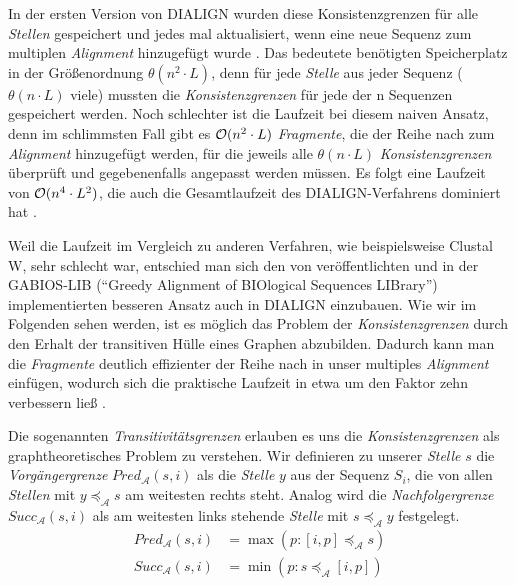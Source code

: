 In der ersten Version von DIALIGN wurden diese Konsistenzgrenzen für alle \emph{Stellen} gespeichert und jedes mal aktualisiert, wenn eine neue Sequenz zum multiplen \emph{Alignment} hinzugefügt wurde \citep{mdw96}. Das bedeutete benötigten Speicherplatz in der Größenordnung $\theta(n^2\cdot L)$, denn für jede \emph{Stelle} aus jeder Sequenz ($\theta(n\cdot L)$ viele) mussten die \emph{Konsistenzgrenzen} für jede der n Sequenzen gespeichert werden. Noch schlechter ist die Laufzeit bei diesem naiven Ansatz, denn im schlimmsten Fall gibt es $\mathcal{O}(n^2\cdot L)$ \emph{Fragmente}, die der Reihe nach zum \emph{Alignment} hinzugefügt werden, für die jeweils alle $\theta(n\cdot L)$ \emph{Konsistenzgrenzen} überprüft und gegebenenfalls angepasst werden müssen. Es folgt eine Laufzeit von $\mathcal{O}(n^4\cdot L^2)$, die auch die Gesamtlaufzeit des DIALIGN-Verfahrens dominiert hat \citep{m99}. 

Weil die Laufzeit im Vergleich zu anderen Verfahren, wie beispielsweise Clustal W, sehr schlecht war, entschied man sich den von \cite{a97} veröffentlichten und in der GABIOS-LIB (\enquote{Greedy Alignment of BIOlogical Sequences LIBrary}) implementierten besseren Ansatz auch in DIALIGN	einzubauen. Wie wir im Folgenden sehen werden, ist es möglich das Problem der \emph{Konsistenzgrenzen} durch den Erhalt der transitiven Hülle eines Graphen abzubilden. Dadurch kann man die \emph{Fragmente} deutlich effizienter der Reihe nach in unser multiples \emph{Alignment} einfügen, wodurch sich die praktische Laufzeit in etwa um den Faktor zehn verbessern ließ \citep{am00}. 

\begin{definition}[Transitivitätsgrenzen]
	Die sogenannten \emph{Transitivitätsgrenzen} erlauben es uns die \emph{Konsistenzgrenzen} als graphtheoretisches Problem zu verstehen. Wir definieren zu unserer \emph{Stelle} $s$ die \emph{Vorgängergrenze} $Pred_{\mathcal{A}}(s,i)$ als die \emph{Stelle} $y$ aus der Sequenz $S_i$, die von allen \emph{Stellen} mit $y \preceq_{\mathcal{A}} s$ am weitesten rechts steht. Analog wird die \emph{Nachfolgergrenze} $Succ_{\mathcal{A}}(s,i)$ als am weitesten links stehende \emph{Stelle} mit $s \preceq_{\mathcal{A}} y$ festgelegt.
	\begin{equation}
	\begin{split}
		Pred_{\mathcal{A}}(s,i) &= \max(p: [i,p] \preceq_{\mathcal{A}} s) \\
		Succ_{\mathcal{A}}(s,i) &= \min(p: s \preceq_{\mathcal{A}} [i,p])
	\end{split}
	\end{equation}
\end{definition}

